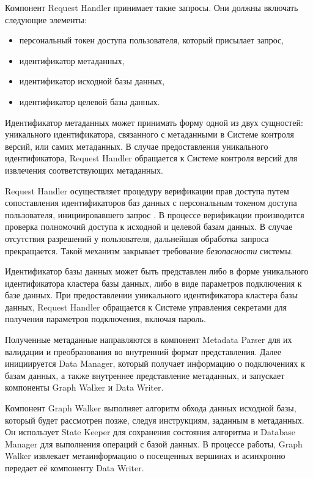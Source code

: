 Компонент Request Handler принимает такие запросы. Они должны включать следующие элементы:

\begin{itemize}
  \item персональный токен доступа пользователя, который присылает запрос,
  \item идентификатор метаданных,
  \item идентификатор исходной базы данных,
  \item идентификатор целевой базы данных.
\end{itemize}

Идентификатор метаданных может принимать форму одной из двух сущностей: уникального идентификатора, связанного с метаданными в Системе контроля версий, или самих метаданных. В случае предоставления уникального идентификатора, Request Handler обращается к Системе контроля версий для извлечения соответствующих метаданных.

Request Handler осуществляет процедуру верификации прав доступа путем сопоставления идентификаторов баз данных с персональным токеном доступа пользователя, инициировавшего запрос \cite{oauth}. В процессе верификации производится проверка полномочий доступа к исходной и целевой базам данных. В случае отсутствия разрешений у пользователя, дальнейшая обработка запроса прекращается. Такой механизм закрывает требование \textit{безопасности} системы.

Идентификатор базы данных может быть представлен либо в форме уникального идентификатора кластера базы данных, либо в виде параметров подключения к базе данных. При предоставлении уникального идентификатора кластера базы данных, Request Handler обращается к Системе управления секретами для получения параметров подключения, включая пароль.

Полученные метаданные направляются в компонент Metadata Parser для их валидации и преобразования во внутренний формат представления. Далее инициируется Data Manager, который получает информацию о подключениях к базам данных, а также внутреннее представление метаданных, и запускает компоненты Graph Walker и Data Writer.

Компонент Graph Walker выполняет алгоритм обхода данных исходной базы, который будет рассмотрен позже, следуя инструкциям, заданным в метаданных. Он использует State Keeper для сохранения состояния алгоритма и Database Manager для выполнения операций с базой данных. В процессе работы, Graph Walker извлекает метаинформацию о посещенных вершинах и асинхронно передает её компоненту Data Writer.


